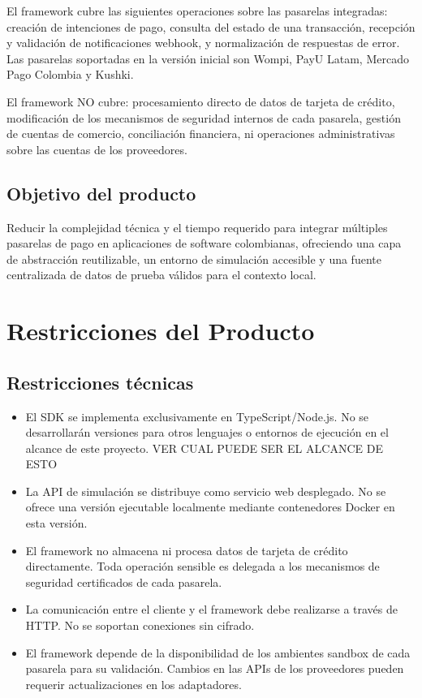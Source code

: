 \documentclass[10pt]{article}
\begin{document}
El framework cubre las siguientes operaciones sobre las pasarelas integradas: creación de intenciones de pago, consulta del estado de una transacción, recepción y validación de notificaciones webhook, y normalización de respuestas de error. Las pasarelas soportadas en la versión inicial son Wompi, PayU Latam, Mercado Pago Colombia y Kushki.

El framework NO cubre: procesamiento directo de datos de tarjeta de crédito, modificación de los mecanismos de seguridad internos de cada pasarela, gestión de cuentas de comercio, conciliación financiera, ni operaciones administrativas sobre las cuentas de los proveedores.

\subsection{Objetivo del producto}

Reducir la complejidad técnica y el tiempo requerido para integrar múltiples pasarelas de pago en aplicaciones de software colombianas, ofreciendo una capa de abstracción reutilizable, un entorno de simulación accesible y una fuente centralizada de datos de prueba válidos para el contexto local.



\section{Restricciones del Producto}

\subsection{Restricciones técnicas}

\begin{itemize}
  \item El SDK se implementa exclusivamente en TypeScript/Node.js. No se desarrollarán versiones para otros lenguajes o entornos de ejecución en el alcance de este proyecto. VER CUAL PUEDE SER EL ALCANCE DE ESTO
  \item La API de simulación se distribuye como servicio web desplegado. No se ofrece una versión ejecutable localmente mediante contenedores Docker en esta versión.
  \item El framework no almacena ni procesa datos de tarjeta de crédito directamente. Toda operación sensible es delegada a los mecanismos de seguridad certificados de cada pasarela.
  \item La comunicación entre el cliente y el framework debe realizarse a través de HTTP. No se soportan conexiones sin cifrado.
  \item El framework depende de la disponibilidad de los ambientes sandbox de cada pasarela para su validación. Cambios en las APIs de los proveedores pueden requerir actualizaciones en los adaptadores.
\end{itemize}
\end{document}
